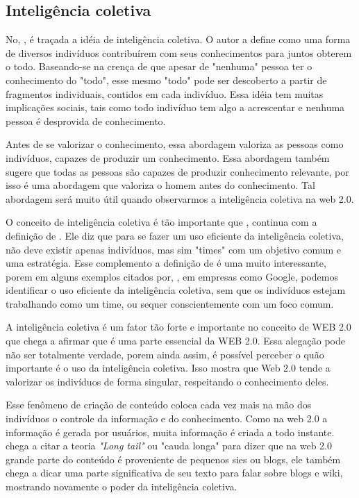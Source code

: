 \documentclass[
	12pt,				%
	openright,			%
	twoside,			%
	a4paper,			%
	Times,
	brazil,				%
	]{abntex2}
\begin{document}
\subsection{Inteligência coletiva}

No, , é traçada a idéia de inteligência coletiva. O autor a define como uma forma de diversos indivíduos contribuírem com seus conhecimentos para juntos obterem o todo. Baseando-se na crença de que apesar de "nenhuma" pessoa ter o conhecimento do "todo", esse mesmo "todo" pode ser descoberto a partir de fragmentos individuais, contidos em cada indivíduo. Essa idéia tem muitas implicações sociais, tais como todo indivíduo tem algo a acrescentar e nenhuma pessoa é desprovida de conhecimento.
\par
Antes de se valorizar o conhecimento, essa abordagem valoriza as pessoas como indivíduos, capazes de produzir um conhecimento. Essa abordagem também sugere que todas as pessoas são capazes de produzir conhecimento relevante, por isso é uma abordagem que valoriza o homem antes do conhecimento. Tal abordagem será muito útil quando observarmos a inteligência coletiva na web 2.0. \cite{inteligencia-coletiva}
\par

O conceito de inteligência coletiva é tão importante que , continua com a definição de . Ele diz que para se fazer um uso eficiente da inteligência coletiva, não deve existir apenas indivíduos, mas sim "times" com um objetivo comum e uma estratégia. Esse complemento a definição de  é uma muito interessante, porem em alguns exemplos citados por, , em empresas como Google, podemos identificar o uso eficiente da inteligência coletiva, sem que os indivíduos estejam trabalhando como um time, ou sequer conscientemente com um foco comum.
\par

A inteligência coletiva é um fator tão forte e importante no conceito de WEB 2.0 que  chega a afirmar que é uma parte essencial da WEB 2.0. Essa alegação pode não ser totalmente verdade, porem ainda assim, é possível perceber o quão importante é o uso da inteligência coletiva. Isso mostra que Web 2.0 tende a valorizar os indivíduos de forma singular, respeitando o conhecimento deles.
\par

Esse fenômeno de criação de conteúdo coloca cada vez mais na mão dos indivíduos o controle da informação e do conhecimento. Como na web 2.0 a informação é gerada por usuários, muita informação é criada a todo instante.  chega a citar a teoria \textit{"Long tail"} ou "cauda longa" para dizer que na web 2.0 grande parte do conteúdo é proveniente de pequenos sies ou blogs, ele também chega a dicar uma parte significativa de seu texto para falar sobre blogs e wiki, mostrando novamente o poder da inteligência coletiva.
\par
\end{document}
